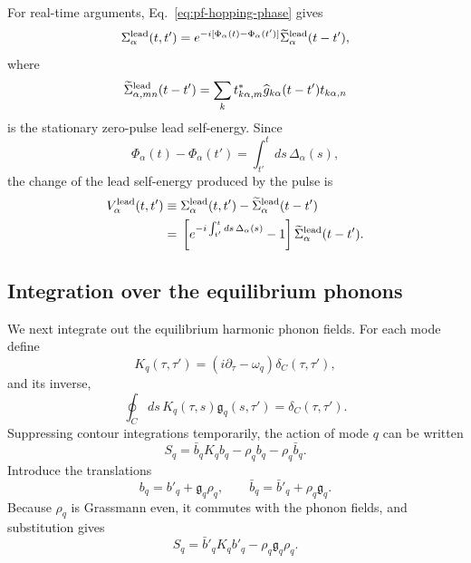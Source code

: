 \documentclass[
 reprint,
 superscriptaddress,
 amsmath,amssymb,
 aps,prb,
 longbibliography,
 floatfix
]{revtex4-2}
\begin{document}
For real-time arguments, Eq.~\eqref{eq:pf-hopping-phase} gives
\begin{equation*}
\Sigma_{\alpha}^{\rm lead}(t,t')
=
e^{-i[\Phi_\alpha(t)-\Phi_\alpha(t')]}
\widetilde\Sigma_{\alpha}^{\rm lead}(t-t'),
\end{equation*}
where
\begin{equation*}
\widetilde\Sigma_{\alpha,mn}^{\rm lead}(t-t')
=
\sum_k
t_{k\alpha,m}^{*}
\widehat g_{k\alpha}(t-t')
t_{k\alpha,n}
\end{equation*}
is the stationary zero-pulse lead self-energy. Since
\begin{equation*}
\Phi_\alpha(t)-\Phi_\alpha(t')
=
\int_{t'}^{t}ds\,\Delta_\alpha(s),
\end{equation*}
the change of the lead self-energy produced by the pulse is
\begin{align*}
V_{\alpha}^{\rm lead}(t,t')
\equiv{}&
\Sigma_{\alpha}^{\rm lead}(t,t')
-
\widetilde\Sigma_{\alpha}^{\rm lead}(t-t')
\\
={}&
\left[
e^{-i\int_{t'}^{t}ds\,\Delta_\alpha(s)}
-1
\right]
\widetilde\Sigma_{\alpha}^{\rm lead}(t-t').
\end{align*}

\subsection{Integration over the equilibrium phonons}
\label{subsec:pf-integrate-phonons}

We next integrate out the equilibrium harmonic phonon fields. For each mode define
\begin{equation*}
K_q(\tau,\tau')
=
(i\partial_\tau-\omega_q)
\delta_C(\tau,\tau'),
\end{equation*}
and its inverse,
\begin{equation*}
\oint_C ds\,
K_q(\tau,s)
\mathfrak g_q(s,\tau')
=
\delta_C(\tau,\tau').
\end{equation*}
Suppressing contour integrations temporarily, the action of mode \(q\) can be written
\begin{equation*}
S_q
=
\bar b_qK_qb_q
-\rho_qb_q
-\rho_q\bar b_q.
\end{equation*}
Introduce the translations
\begin{equation*}
b_q
=
b'_q+\mathfrak g_q\rho_q,
\qquad
\bar b_q
=
\bar b'_q+\rho_q\mathfrak g_q.
\end{equation*}
Because \(\rho_q\) is Grassmann even, it commutes with the phonon fields, and substitution gives
\begin{equation*}
S_q
=
\bar b'_qK_qb'_q
-
\rho_q\mathfrak g_q\rho_q.
\end{equation*}
\end{document}
